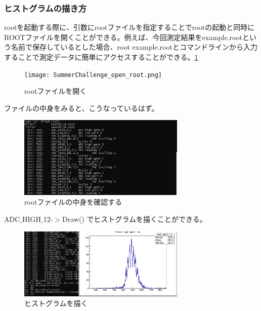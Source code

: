 \subsubsection{ヒストグラムの描き方}
rootを起動する際に、引数にrootファイルを指定することでrootの起動と同時にROOTファイルを開くことができる。例えば、今回測定結果をexample.rootという名前で保存しているとした場合、root example.rootとコマンドラインから入力することで測定データに簡単にアクセスすることができる。\ref{fig:open_ROOT}
\begin{figure}[h]
  \begin{center}
    \texttt{[image: SummerChallenge\_open\_root.png]}
    \caption{rootファイルを開く}
    \label{fig:open_ROOT}
  \end{center}
\end{figure}

ファイルの中身をみると、こうなっているはず。

\begin{figure}[h]
  \begin{center}
    \includegraphics[width=8cm]{SummerChallenge_ls_list.png}
    \caption{rootファイルの中身を確認する}
    \label{fig:ls_ROOT}
  \end{center}
\end{figure}

ADC$\_$HIGH$\_$12-$>$Draw() でヒストグラムを描くことができる。

\begin{figure}[h]
  \begin{center}
    \includegraphics[width=8cm]{SummerChallenge_draw_adc12.png}
    \caption{ヒストグラムを描く}
    \label{fig:ls_ROOT}
  \end{center}
\end{figure}

